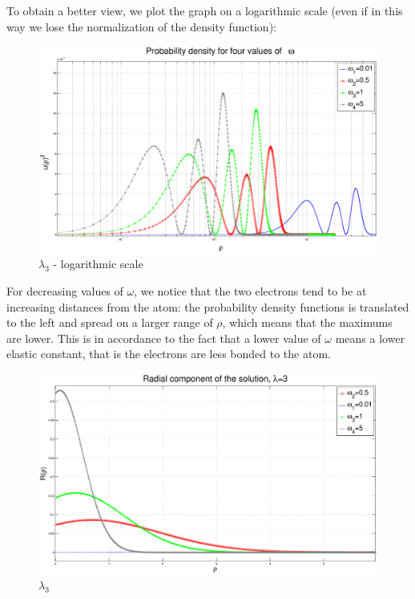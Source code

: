 \documentclass {article}
\begin{document}
To obtain a better view, we plot the graph on a logarithmic scale (even if in this way we lose the normalization of the density function):

\begin{figure}[H]
	\centering
	\includegraphics[width=16cm]{cacca}
	\caption{$\lambda_3$ - logarithmic scale}
	\label{23}
\end{figure}

For decreasing values of $\omega$, we notice that the two electrons tend to be at increasing distances from the atom: the probability density functions is translated to the left and spread on a larger range of $\rho$, which means that the maximums are lower. This is in accordance to the fact that a lower value of $\omega$ means a lower elastic constant, that is the electrons are less bonded to the atom.

\begin{figure}[H]
	\centering
	\includegraphics[width=16cm]{cacca2}
	\caption{$\lambda_3$}
	\label{24}
\end{figure}
\end{document}
